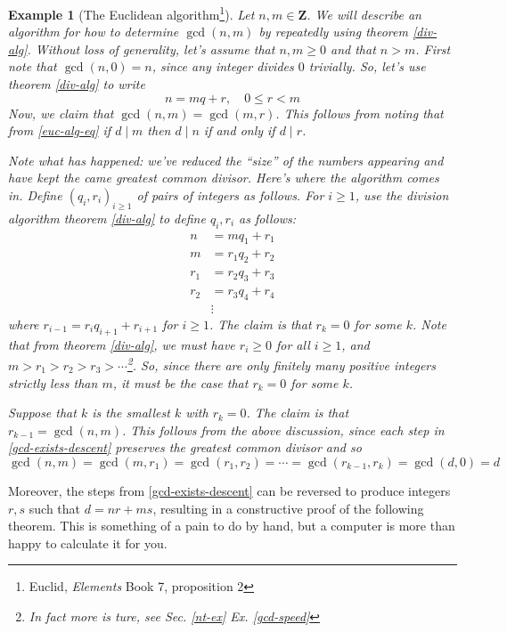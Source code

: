 \documentclass[12pt]{article}
\numberwithin{equation}{subsection}
\theoremstyle{note}
\newtheorem{example}[subsection]{Example}
\begin{document}
\begin{example}[The Euclidean algorithm\footnote{Euclid, \textit{Elements} Book 7, proposition 2}] \label{Euc-alg}
	Let $n,m\in \mathbf{Z}$. We will describe an algorithm for how to determine $\gcd(n,m)$ by repeatedly using theorem \ref{div-alg}. Without loss of generality, let's assume that $n,m\geq 0$ and that $n>m$. First note that $\gcd(n,0)=n$, since any integer divides $0$ trivially. So, let's use theorem \ref{div-alg} to write \begin{equation} \label{euc-alg-eq} n=mq+r, \quad 0\leq r<m \end{equation} Now, we claim that $\gcd(n,m)=\gcd(m,r)$. This follows from noting that from \eqref{euc-alg-eq} if $d\mid m$ then $d\mid n$ if and only if $d\mid r$. 
	
	Note what has happened: we've reduced the ``size'' of the numbers appearing and have kept the came greatest common divisor. Here's where the algorithm comes in. Define $(q_i,r_i)_{i\geq 1}$ of pairs of integers as follows. For $i\geq 1$, use the division algorithm theorem \ref{div-alg} to define $q_i,r_i$ as follows: \begin{align}\label{gcd-exists-descent} 
		n&=mq_1+r_1 \nonumber \\
		m&=r_1 q_2+r_2 \nonumber \\
		r_1&= r_2 q_3+r_3 \nonumber \\
		r_2& = r_3q_4 + r_4  \\
		&\vdots \nonumber
	\end{align}
	where $r_{i-1}=r_{i}q_{i+1}+r_{i+1}$ for $i\geq 1$. The claim is that $r_k=0$ for some $k$. Note that from theorem \ref{div-alg}, we must have $r_i\geq 0$ for all $i\geq 1$, and $m> r_1>r_2>r_3>\cdots$\footnote{In fact more is ture, see Sec. \ref{nt-ex} Ex. \ref{gcd-speed} }. So, since there are only finitely many positive integers strictly less than $m$, it must be the case that $r_k=0$ for some $k$. 
	
	Suppose that $k$ is the smallest $k$ with $r_k=0$. The claim is that $r_{k-1}=\gcd(n,m)$. This follows from the above discussion, since each step in \eqref{gcd-exists-descent} preserves the greatest common divisor and so \[ \gcd(n,m)=\gcd(m,r_1)=\gcd(r_1,r_2)=\cdots = \gcd(r_{k-1},r_k)=\gcd(d,0)=d\] 
\end{example}

Moreover, the steps from \eqref{gcd-exists-descent} can be reversed to produce integers $r,s$ such that $d=nr+ms$, resulting in a constructive proof of the following theorem. This is something of a pain to do by hand, but a computer is more than happy to calculate it for you.
\end{document}
